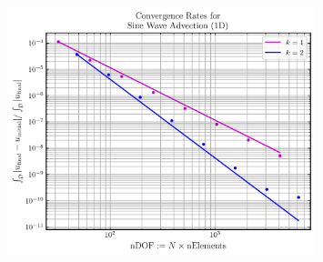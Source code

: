 \documentclass{beamer}
\begin{document}
\begin{frame}

  \begin{figure}[htb!]
    \centering
    \includegraphics[width=0.8\textwidth]{fig.ConvergenceRates.png}
  \end{figure}

\end{frame}

%
%
\end{document}
